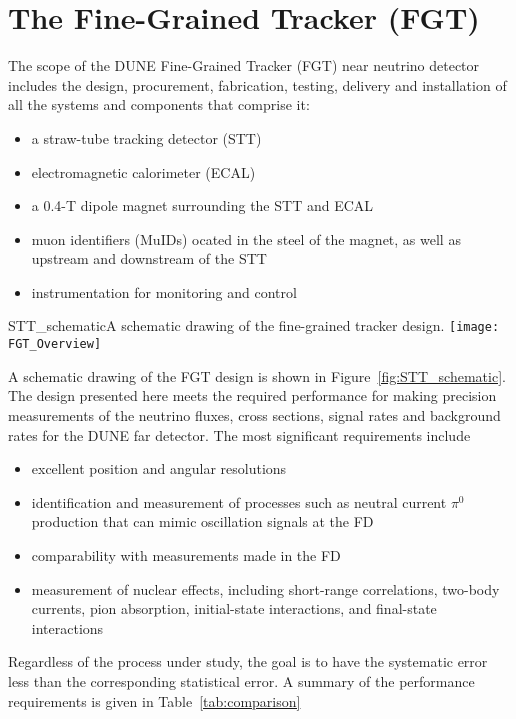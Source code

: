 \section{The Fine-Grained Tracker (FGT)} 
\label{cdrsec:detectors-nd-ref-fgt}

The scope of the DUNE Fine-Grained Tracker (FGT) near neutrino detector includes the design, procurement, fabrication, testing, delivery and installation of all the systems and components that comprise it:


\begin{itemize}
\item a straw-tube tracking detector (STT)
\item electromagnetic calorimeter (ECAL) 
\item a 0.4-T dipole magnet surrounding the STT and ECAL
\item muon identifiers (MuIDs) ocated in the steel of the magnet, as well as upstream and downstream of the STT
\item instrumentation for monitoring and control
\end{itemize}



\begin{cdrfigure}{STT_schematic}{A schematic drawing of the fine-grained tracker design.}
\texttt{[image: FGT\_Overview]}
\end{cdrfigure}

A schematic drawing of the FGT design is shown in Figure~\ref{fig:STT_schematic}.   The design presented here meets the required performance for making precision measurements of the 
neutrino fluxes, cross sections, signal rates and background rates for the DUNE far detector. The most significant requirements include 

\begin{itemize}
\item excellent position and angular resolutions
\item  identification and measurement of processes such as neutral current $\pi^0$ production that can mimic oscillation signals at the FD
\item comparability with measurements made in the FD
\item measurement of nuclear effects, including short-range correlations, two-body currents, pion absorption, initial-state interactions, 
and final-state interactions
\end{itemize}
Regardless of the process under study, the goal is
to have the systematic error less than the corresponding statistical error. A summary of the performance
requirements is given in Table~\ref{tab:comparison}

